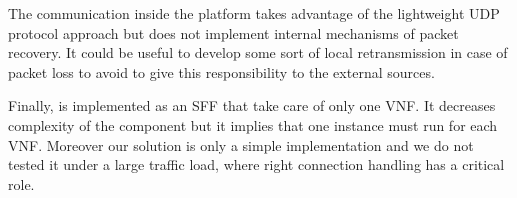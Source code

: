 The communication inside the platform takes advantage of the lightweight UDP
protocol approach but does not implement internal mechanisms of packet recovery.
It could be useful to develop some sort of local retransmission in case of
packet loss to avoid to give this responsibility to the external sources.

Finally, \astaire{} is implemented as an SFF that take care of only one VNF. It
decreases complexity of the component but it implies that one \astaire{}
instance must run for each VNF. Moreover our solution is only a simple
implementation and we do not tested it under a large traffic load, where right
connection handling has a critical role.
